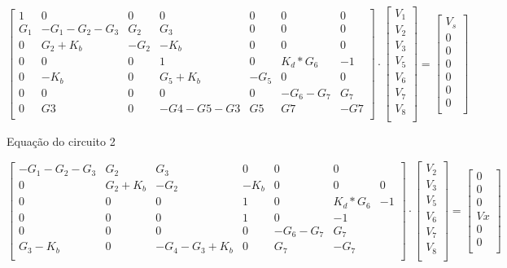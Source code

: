 \[
\begin{bmatrix}
1 & 0 & 0 & 0 & 0 & 0 & 0\\
G_1 & -G_1-G_2-G_3 & G_2 & G_3 &  0 & 0 & 0\\
0 & G_2+K_b & -G_2 & -K_b & 0 & 0 & 0\\
0 & 0 & 0 & 1 & 0 & K_d*G_6 & -1\\
0 & -K_b & 0 & G_5+K_b & -G_5 & 0 & 0\\
0 & 0 & 0 & 0 & 0 & -G_6 - G_7 & G_7\\
0 & G3 & 0 & -G4-G5-G3 & G5 & G7 & -G7\\
\end{bmatrix}
\cdot
\begin{bmatrix}
V_1\\
V_2\\
V_3\\
V_5\\
V_6\\
V_7\\
V_8\\
\end{bmatrix}
=
\begin{bmatrix}
V_s\\
0\\
0\\
0\\
0\\
0\\
0\\
\end{bmatrix}
\]


\vspace{0.5cm}
Equação do circuito 2
\vspace{0.5cm}

\[
\begin{bmatrix}
-G_1-G_2-G_3 & G_2 & G_3 &  0 & 0 & 0\\
0 & G_2 + K_b & -G_2 & -K_b & 0 & 0 & 0\\
0 & 0 & 0 & 1 & 0 & K_d*G_6 & -1\\
0 & 0 & 0 & 1 & 0 & -1\\
0 & 0 & 0 & 0 & -G_6-G_7 & G_7\\
G_3-K_b & 0 & -G_4 - G_3+K_b & 0 & G_7 & -G_7\\

\end{bmatrix}
\cdot
\begin{bmatrix}
V_2\\
V_3\\
V_5\\
V_6\\
V_7\\
V_8\\
\end{bmatrix}
=
\begin{bmatrix}
0\\
0\\
0\\
Vx\\
0\\
0\\
\end{bmatrix}
\]


